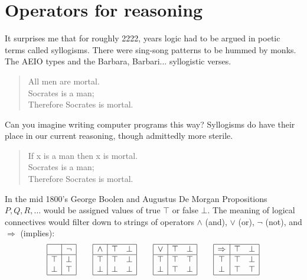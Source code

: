 \section{Operators for reasoning}

It surprises me that for roughly 2222, years logic had to be argued 
in poetic terms called syllogisms.  There were sing-song patterns 
to be hummed by monks. The AEIO types and the Barbara, Barbari...  
syllogistic verses.
\begin{quote}
    All men are mortal.\\
    Socrates is a man;\\
    Therefore Socrates is mortal.
\end{quote}
Can you imagine writing computer programs this way?
Syllogisms do have their place in our current reasoning,
though admittedly more sterile.
\begin{quote}
    If x is a man then x is mortal.\\
    Socrates is a man;\\
    Therefore Socrates is mortal.
\end{quote}
In the mid 1800's
George Boolen and Augustus De Morgan 
Propositions $P,Q,R,\ldots$
would be assigned values of true $\top$ or false $\bot$. 
The meaning of logical connectives would filter down to strings 
of operators $\wedge$ (and), $\vee$ (or), $\neg$ (not), and $\Rightarrow$ (implies):
\begin{gather*}
    \begin{array}{|c|c|}
        \hline 
         & \neg \\
        \hline 
        \top & \bot \\
        \bot & \top\\
        \hline
    \end{array}
    \qquad
    \begin{array}{|c|cc|}
        \hline 
        \wedge & \top & \bot\\
        \hline 
        \top & \top & \bot \\
        \bot & \bot & \bot\\
        \hline
    \end{array}
    \qquad 
    \begin{array}{|c|cc|}
        \hline 
        \vee & \top & \bot\\
        \hline 
        \top & \top & \top \\
        \bot & \top & \bot\\
        \hline
    \end{array}
    \qquad
    \begin{array}{|c|cc|}
        \hline 
        \Rightarrow & \top & \bot\\
        \hline 
        \top & \top & \bot \\
        \bot & \top & \top\\
        \hline
    \end{array}
\end{gather*}
